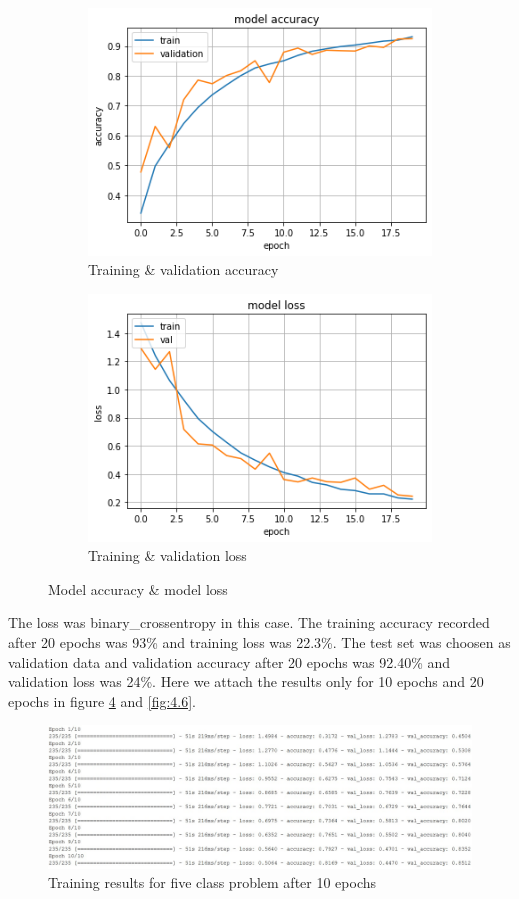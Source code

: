 \begin{figure}[htbp]
    \centering
    \begin{subfigure}[t]{0.45\textwidth}
        \includegraphics[scale = 0.52]{CHAPTERS/Chapter-4/Images/4.4a}
        \caption{Training \& validation accuracy}
        \label{fig:4.4a}
    \end{subfigure}
    \begin{subfigure}[t]{0.45\textwidth}
        \includegraphics[scale = 0.52]{CHAPTERS/Chapter-4/Images/4.4b}
        \caption{Training \& validation loss}
        \label{fig:4.4b}
    \end{subfigure}
    \caption[]{Model accuracy \& model loss}
    \label{fig:4.4}
  \end{figure}
  The loss was binary\_crossentropy in this case. 
  The training accuracy recorded after 20 epochs was 93\% and training
  loss was 22.3\%. The test set was choosen as validation data and
  validation accuracy after 20 epochs 
  was 92.40\% and validation loss was 24\%.
  Here we attach the results only for 10 epochs and 20 epochs
  in figure \ref{fig:4.5} and \ref{fig:4.6}.
\begin{figure}[H]
    \centering
    \captionsetup{justification = centering}
    \includegraphics[scale = 0.53]{CHAPTERS/Chapter-4/Images/4.5}
    \caption{Training results for five class problem after 10 epochs} 
    \label{fig:4.5}
\end{figure}
